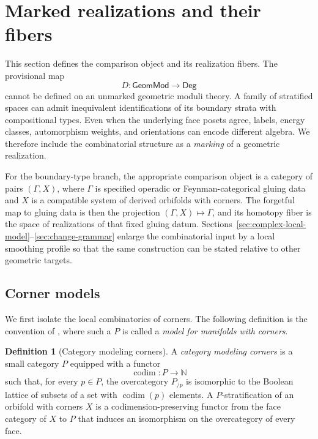 \documentclass[11pt,letterpaper,twoside]{article}
\theoremstyle{plain}
\theoremstyle{definition}
\newtheorem{definition}[theorem]{Definition}
\theoremstyle{remark}
\newcommand{\namecite}[2]{\citet{#2}}
\newcommand{\Deg}{\mathsf{Deg}}
\newcommand{\GeomMod}{\mathsf{GeomMod}}
\begin{document}
\section{Marked realizations and their fibers}\label{sec:comparison}

This section defines the comparison object and its realization fibers.  The provisional map
\[
  D:\GeomMod\longrightarrow\Deg
\]
cannot be defined on an unmarked geometric moduli theory.  A family of stratified spaces can admit inequivalent identifications of its boundary strata with compositional types.  Even when the underlying face posets agree, labels, energy classes, automorphism weights, and orientations can encode different algebra.  We therefore include the combinatorial structure as a \emph{marking} of a geometric realization.

For the boundary-type branch, the appropriate comparison object is a category of pairs \((\Gamma,X)\), where \(\Gamma\) is specified operadic or Feynman-categorical gluing data and \(X\) is a compatible system of derived orbifolds with corners.  The forgetful map to gluing data is then the projection \((\Gamma,X)\mapsto\Gamma\), and its homotopy fiber is the space of realizations of that fixed gluing datum.  Sections~\ref{sec:complex-local-model}--\ref{sec:change-grammar} enlarge the combinatorial input by a local smoothing profile so that the same construction can be stated relative to other geometric targets.

\subsection{Corner models}

We first isolate the local combinatorics of corners.  The following definition is the convention of \namecite{Abouzaid and Blumberg}{abouzaidblumberg2024}, where such a \(P\) is called a \emph{model for manifolds with corners}.

\begin{definition}[Category modeling corners]\label{def:corner-model}
A \emph{category modeling corners} is a small category \(P\) equipped with a functor
\[
 \operatorname{codim}:P\longrightarrow\mathbb N
\]
such that, for every \(p\in P\), the overcategory \(P_{/p}\) is isomorphic to the Boolean lattice of subsets of a set with \(\operatorname{codim}(p)\) elements.  A \(P\)-stratification of an orbifold with corners \(X\) is a codimension-preserving functor from the face category of \(X\) to \(P\) that induces an isomorphism on the overcategory of every face.
\end{definition}
\end{document}
